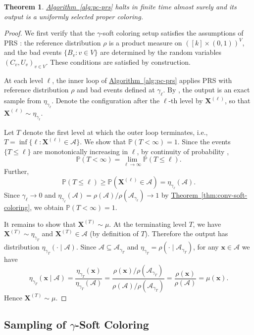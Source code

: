 \documentclass[12pt, a4paper]{article}
\theoremstyle{plain}
\newtheorem{theorem}{Theorem}
\theoremstyle{definition}
\theoremstyle{remark}
\newcommand{\mc}{\mathcal}
\renewcommand{\v}[1]{\boldsymbol{#1}}
\newcommand{\pp}{\mathbb{P}}
\newcommand{\mx}{\v{x}}
\newcommand{\mX}{\v{X}}
\newcommand{\lt}{\left}
\newcommand{\rt}{\right}
\newcommand{\sref}[2]{\hyperref[#2]{#1~\ref*{#2}}}
\begin{document}
\begin{theorem}
\label{thm:prs_coloring}
\sref{Algorithm}{alg:pc-prs} halts in finite time almost surely and its output is a uniformly selected proper coloring.
\end{theorem}
\begin{proof}
We first verify that the \(\gamma\)-soft coloring setup satisfies the assumptions of PRS \cite[Theorem 4.5]{GJL17}: the reference distribution \(\rho\) is a product measure on \(([k]\times(0,1))^V\), and the bad events \(\{B_v:v\in V\}\) are determined by the random variables \((C_v,U_v)_{v\in V}\). These conditions are satisfied by construction.

At each level \(\ell\), the inner loop of \sref{Algorithm}{alg:pc-prs} applies PRS with reference distribution \(\rho\) and bad events defined at \(\gamma_\ell\). By \cite[Theorem 4.5]{GJL17}, the output is an exact sample from \(\eta_{\gamma_\ell}\). Denote the configuration after the \(\ell\)-th level by \(\mX^{(\ell)}\), so that \(\mX^{(\ell)} \sim \eta_{\gamma_\ell}\).

Let $T$ denote the first level at which the outer loop terminates, i.e., $T=\inf\{\ell:\mX^{(\ell)}\in\mc A\}$. We show that $\pp(T < \infty) = 1$. Since the events $\{T \leq \ell\}$ are monotonically increasing in $\ell$, by continuity of probability \cite[Chapter 2]{SB95},
\[
\pp(T < \infty) = \lim_{\ell \to \infty} \pp\lt( T \leq \ell \rt).
\]
Further,
\[
\pp\lt( T \leq \ell \rt) \geq \pp\lt( \mX^{(\ell)} \in \mc A\rt) = \eta_{\gamma_\ell} (\mc A).
\]
Since $\gamma_\ell \to 0$ and $\eta_{\gamma_\ell}(\mc A) = \rho(\mc A)/\rho(\mc A_{\gamma_\ell}) \to 1$ by \sref{Theorem}{thm:conv-soft-coloring}, we obtain $\pp(T < \infty) = 1$.

It remains to show that $\mX^{(T)} \sim \mu$. At the terminating level $T$, we have $\mX^{(T)} \sim \eta_{\gamma_T}$ and $\mX^{(T)} \in \mc A$ (by definition of $T$). Therefore the output has distribution $\eta_{\gamma_T}(\cdot \mid \mc A)$. Since $\mc A \subseteq \mc A_{\gamma_T}$ and $\eta_{\gamma_T} = \rho(\cdot \mid \mc A_{\gamma_T})$, for any $\mx \in \mc A$ we have
\[
\eta_{\gamma_T}(\mx \mid \mc A) = \frac{\eta_{\gamma_T}(\mx)}{\eta_{\gamma_T}(\mc A)} = \frac{\rho(\mx)/\rho(\mc A_{\gamma_T})}{\rho(\mc A)/\rho(\mc A_{\gamma_T})} = \frac{\rho(\mx)}{\rho(\mc A)} = \mu(\mx).
\]
Hence $\mX^{(T)} \sim \mu$.
\end{proof}

\subsection{Sampling of \texorpdfstring{\(\gamma \)}{TEXT}-Soft Coloring}
\label{sec:sampling-gamma-soft}
\end{document}
